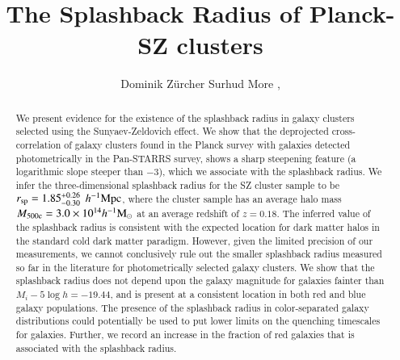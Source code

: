 \documentclass[iop, apjl, twocolappendix, numberedappendix]{emulateapj}
\def\mpch{h^{-1}{\rm Mpc}}
\def\msunh{h^{-1}{\rm M_{\odot}}}
\begin{document}
\title{The Splashback Radius of Planck-SZ clusters}

\author{
Dominik Zürcher 
Surhud More , 
}

\begin{abstract}
We present evidence for the existence of the splashback radius
in galaxy clusters selected using the Sunyaev-Zeldovich effect.
We show that the deprojected cross-correlation of galaxy clusters
found in the Planck survey with galaxies detected photometrically in
the Pan-STARRS survey, shows a sharp steepening feature (a
logarithmic slope steeper than $-3$), which we associate with the
splashback radius.  We infer the three-dimensional splashback radius
for the SZ cluster sample to be $r_{\rm sp}=1.85_{-0.30}^{+0.26}$ $\mpch$,
where the cluster sample has an average halo mass $M_{\rm
500c}=3.0\times10^{14}\msunh$ at an average redshift of $z=0.18$.
The inferred value of the splashback radius is consistent with the
expected location for dark matter halos in the standard cold dark
matter paradigm. However, given the limited precision of our
measurements, we cannot conclusively rule out the smaller splashback
radius measured so far in the literature for photometrically
selected galaxy clusters. We show that the splashback radius does
not depend upon the galaxy magnitude for galaxies fainter than
$M_i-5\log h=-19.44$, and is present at a consistent location in
both red and blue galaxy populations. The presence of the splashback radius in
color-separated galaxy distributions could potentially be used to put lower limits on the
quenching timescales for galaxies. Further, we record an increase 
in the fraction of red galaxies that is associated with the splashback radius.

\end{abstract}

\end{document}
